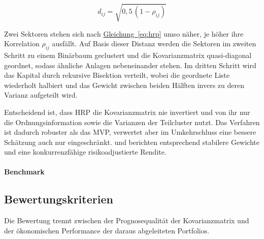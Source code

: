 \documentclass[12pt,a4paper]{article}
\begin{document}
\begin{equation}
	d_{ij} = \sqrt{0{,}5\,(1 - \rho_{ij})}
	\label{eq:hrp}
\end{equation}

Zwei Sektoren stehen sich nach \hyperref[eq:hrp]{Gleichung~\ref*{eq:hrp}} umso näher, je höher ihre Korrelation $\rho_{ij}$ ausfällt.
Auf Basis dieser Distanz werden die Sektoren im zweiten Schritt zu einem Binärbaum geclustert und die Kovarianzmatrix quasi-diagonal geordnet, sodass ähnliche Anlagen nebeneinander stehen.
Im dritten Schritt wird das Kapital durch rekursive Bisektion verteilt, wobei die geordnete Liste wiederholt halbiert und das Gewicht zwischen beiden Hälften invers zu deren Varianz aufgeteilt wird.

Entscheidend ist, dass HRP die Kovarianzmatrix nie invertiert und von ihr nur die Ordnungsinformation sowie die Varianzen der Teilcluster nutzt.
Das Verfahren ist dadurch robuster als das MVP, verwertet aber im Umkehrschluss eine bessere Schätzung auch nur eingeschränkt.
\textcite{deprado2016} und \textcite{sen2022} berichten entsprechend stabilere Gewichte und eine konkurrenzfähige risikoadjustierte Rendite.
\fi

\paragraph{Benchmark}

\subsection{Bewertungskriterien}\label{subsec:kriterien}
Die Bewertung trennt zwischen der Prognosequalität der Kovarianzmatrix und der ökonomischen Performance der daraus abgeleiteten Portfolios.
\end{document}
